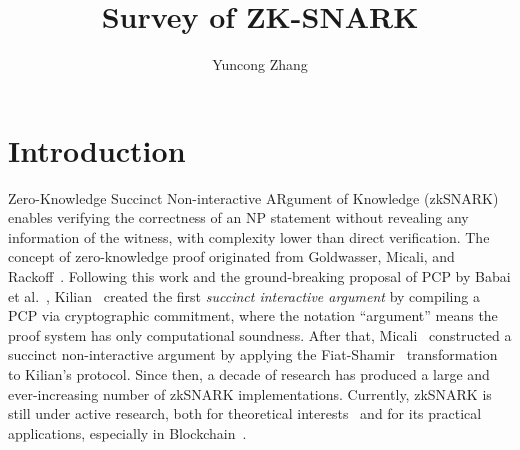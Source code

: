 \documentclass[12pt]{article}
\title{Survey of ZK-SNARK}
\author{Yuncong Zhang}
\theoremstyle{plain}
\theoremstyle{definition}
\theoremstyle{remark}
\begin{document}
\maketitle
\begin{abstract}
\end{abstract}

\section{Introduction}

Zero-Knowledge Succinct Non-interactive ARgument of Knowledge (zkSNARK) enables verifying the correctness of an NP statement without revealing any information of the witness, with complexity lower than direct verification.
The concept of zero-knowledge proof originated from Goldwasser, Micali, and Rackoff~\cite{GoldwasserMR85}.
Following this work and the ground-breaking proposal of PCP by Babai et al.~\cite{BabaiFLS91}, Kilian~\cite{Kilian92} created the first \emph{succinct interactive argument} by compiling a PCP via cryptographic commitment, where the notation ``argument'' means the proof system has only computational soundness.
After that, Micali~\cite{Micali00} constructed a succinct non-interactive argument by applying the Fiat-Shamir~\cite{FiatS86} transformation to Kilian's protocol.
Since then, a decade of research has produced a large and ever-increasing number of zkSNARK implementations.
Currently, zkSNARK is still under active research, both for theoretical interests~\cite{NaorY90} and for its practical applications, especially in Blockchain~\cite{Ben-SassonCG0MTV14}.
\end{document}
